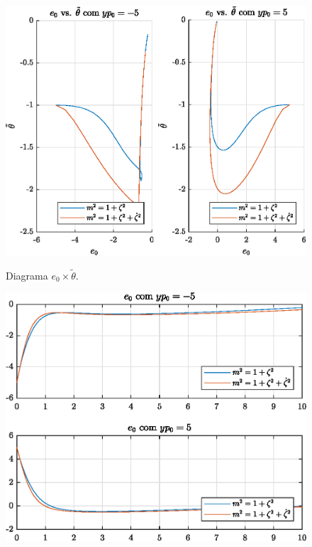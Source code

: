 \bigskip%
\begin{figure}[H]
  \centering
  \includegraphics[width=12cm]{figs/e0_vs_deltatheta/yp0-5yp05.eps} \\[2mm]
  \caption{Diagrama $e_0 \times \tilde{\theta}$.}
\end{figure}

\begin{figure}[H]
  \centering
  \includegraphics[width=12cm]{figs/e0/yp0-5yp05.eps}
\end{figure}

